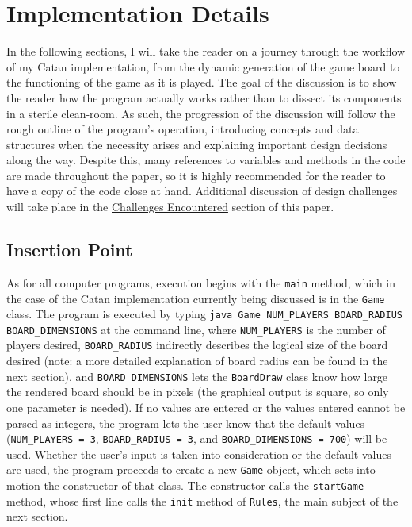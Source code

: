 \documentclass[pageno]{jpaper}
\begin{document}
\begin{doublespacing}
\hypertarget{sec:implementation_details}{}
\section{Implementation Details \cite{self2014}}

In the following sections, I will take the reader on a journey through the workflow of my Catan implementation, from the dynamic generation of the game board to the functioning of the game as it is played. The goal of the discussion is to show the reader how the program actually works rather than to dissect its components in a sterile clean-room. As such, the progression of the discussion will follow the rough outline of the program's operation, introducing concepts and data structures when the necessity arises and explaining important design decisions along the way. Despite this, many references to variables and methods in the code are made throughout the paper, so it is highly recommended for the reader to have a copy of the code close at hand. Additional discussion of design challenges will take place in the \hyperlink{sec:challenges_encountered}{Challenges Encountered} section of this paper.

\hypertarget{sec:insertion_point}{}
\subsection{Insertion Point}

As for all computer programs, execution begins with the \lstinline$main$ method, which in the case of the Catan implementation currently being discussed is in the \lstinline$Game$ class. The program is executed by typing \lstinline$java Game NUM_PLAYERS BOARD_RADIUS BOARD_DIMENSIONS$ at the command line, where \lstinline$NUM_PLAYERS$ is the number of players desired, \lstinline$BOARD_RADIUS$ indirectly describes the logical size of the board desired (note: a more detailed explanation of board radius can be found in the next section), and \lstinline$BOARD_DIMENSIONS$ lets the \lstinline$BoardDraw$ class know how large the rendered board should be in pixels (the graphical output is square, so only one parameter is needed). If no values are entered or the values entered cannot be parsed as integers, the program lets the user know that the default values (\lstinline$NUM_PLAYERS = 3$, \lstinline$BOARD_RADIUS = 3$, and \lstinline$BOARD_DIMENSIONS = 700$) will be used. Whether the user's input is taken into consideration or the default values are used, the program proceeds to create a new \lstinline$Game$ object, which sets into motion the constructor of that class. The constructor calls the \lstinline$startGame$ method, whose first line calls the \lstinline$init$ method of \lstinline$Rules$, the main subject of the next section.


\end{doublespacing}
\end{document}

